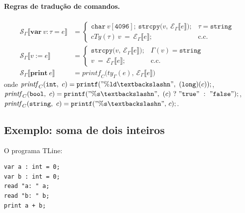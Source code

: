 \paragraph{Regras de tradução de comandos.}

\begin{Definition}\label{def:tline-stmt}
  \begin{align*}
    \mathcal{S}_\Gamma\llbracket \mathbf{var}\ v : \tau = e \rrbracket
    &=
    \begin{cases}
      \mathtt{char\ }v\mathtt{[4096];\ strcpy(}v\mathtt{,\ }\mathcal{E}_\Gamma\llbracket
      e\rrbracket\mathtt{);}
      & \tau = \mathtt{string} \\
      \mathit{cTy}(\tau)\ v\ \mathtt{=}\ \mathcal{E}_\Gamma\llbracket
      e\rrbracket\mathtt{;}
      & \text{c.c.}
    \end{cases} \\[6pt]
    \mathcal{S}_\Gamma\llbracket v \mathrel{:=} e \rrbracket
    &=
    \begin{cases}
      \mathtt{strcpy(}v\mathtt{,\ }\mathcal{E}_\Gamma\llbracket
      e\rrbracket\mathtt{);}
      & \Gamma(v) = \mathtt{string} \\
      v\ \mathtt{=}\ \mathcal{E}_\Gamma\llbracket e\rrbracket\mathtt{;}
      & \text{c.c.}
    \end{cases} \\[6pt]
    \mathcal{S}_\Gamma\llbracket \mathbf{print}\ e \rrbracket
    &=
    \mathit{printf}_C\bigl(\mathit{ty}_\Gamma(e),\ \mathcal{E}_\Gamma\llbracket
    e\rrbracket\bigr)
  \end{align*}
  onde $\mathit{printf}_C(\mathtt{int},\ c) =
  \mathtt{printf("\%ld\textbackslash n",\ (long)(}c\mathtt{));}$,
  $\mathit{printf}_C(\mathtt{bool},\ c) =
  \mathtt{printf("\%s\textbackslash
  n",\ (}c\mathtt{)\ ?\ "true"\ :\ "false");}$,
  $\mathit{printf}_C(\mathtt{string},\ c) =
  \mathtt{printf("\%s\textbackslash n",\ }c\mathtt{);}$.
\end{Definition}

\subsection{Exemplo: soma de dois inteiros}

O programa TLine:
\begin{verbatim}
var a : int = 0;
var b : int = 0;
read "a: " a;
read "b: " b;
print a + b;
\end{verbatim}

